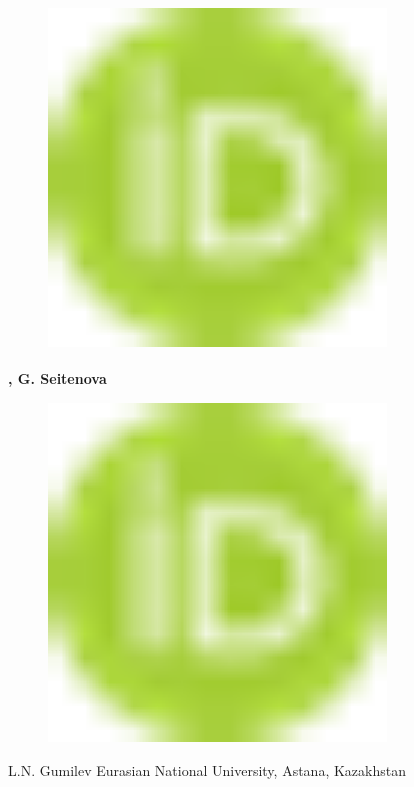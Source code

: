 \begin{figure}[H]
	\centering
	\includegraphics[width=0.8\textwidth]{media/chem/image1}
	\caption*{}
\end{figure}
{\bfseries \textsuperscript{\envelope },
G.
Seitenova}
\begin{figure}[H]
	\centering
	\includegraphics[width=0.8\textwidth]{media/chem/image1}
	\caption*{}
\end{figure}
{\bfseries \textsuperscript{\envelope }}

L.N. Gumilev Eurasian National University, Astana, Kazakhstan

